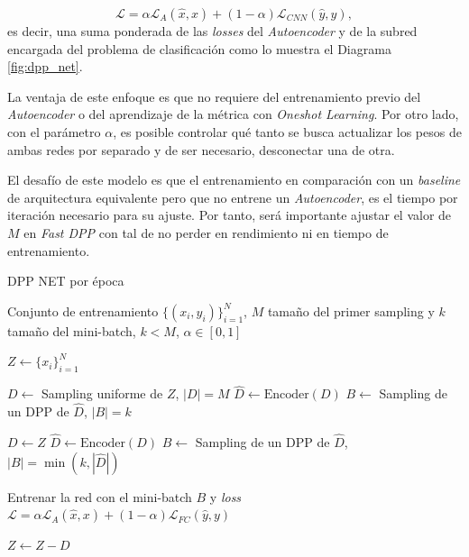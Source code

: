 \[
\mathcal{L} = \alpha\mathcal{L}_A(\hat{x},x) + (1-\alpha)\mathcal{L}_{CNN}(\hat{y},y) , 
\] es decir, una suma ponderada de las \textit{losses} del \textit{Autoencoder} y de la subred encargada del problema de clasificación como lo muestra el Diagrama \ref{fig:dpp_net}.

\vspace{0.2cm}

La ventaja de este enfoque es que no requiere del entrenamiento previo del \textit{Autoencoder} o del aprendizaje de la métrica con \textit{Oneshot Learning}. Por otro lado, con el parámetro $\alpha$, es posible controlar qué tanto se busca actualizar los pesos de ambas redes por separado y de ser necesario, desconectar una de otra. 

\vspace{0.2cm}

El desafío de este modelo es que el entrenamiento en comparación con un \textit{baseline} de arquitectura equivalente pero que no entrene un \textit{Autoencoder}, es el tiempo por iteración necesario para su ajuste. Por tanto, será importante ajustar el valor de $M$ en \textit{Fast DPP} con tal de no perder en rendimiento ni en tiempo de entrenamiento. 

\begin{algorithm}
\caption{DPP NET por época}\label{alg:alg7}
\begin{algorithmic}
\Require Conjunto de entrenamiento $\{(x_i,y_i) \}_{i=1}^N$, $M$ tamaño del primer sampling y $k$ tamaño del mini-batch, $k < M$, $\alpha \in [0,1]$ 

\State $Z \gets \{x_i\}_{i=1}^N$


\State $D \gets$ Sampling uniforme de $Z$, $|D| = M$
\State $\hat{D} \gets \text{Encoder}(D)$
\State $B \gets$ Sampling de un DPP de $\hat{D}$, $|B| = k$  

\Else

\State $D \gets Z$
\State $\hat{D} \gets \text{Encoder}(D)$
\State $B \gets$ Sampling de un DPP de $\hat{D}$, $|B| = \min(k, |\hat{D}|)$ 

\EndIf

\State Entrenar la red con el mini-batch $B$ y \textit{loss} $\mathcal{L} = \alpha\mathcal{L}_A(\hat{x},x) + (1-\alpha)\mathcal{L}_{FC}(\hat{y},y) $ 

\State $Z \gets Z - D$

\EndWhile  
\end{algorithmic}
\end{algorithm}

